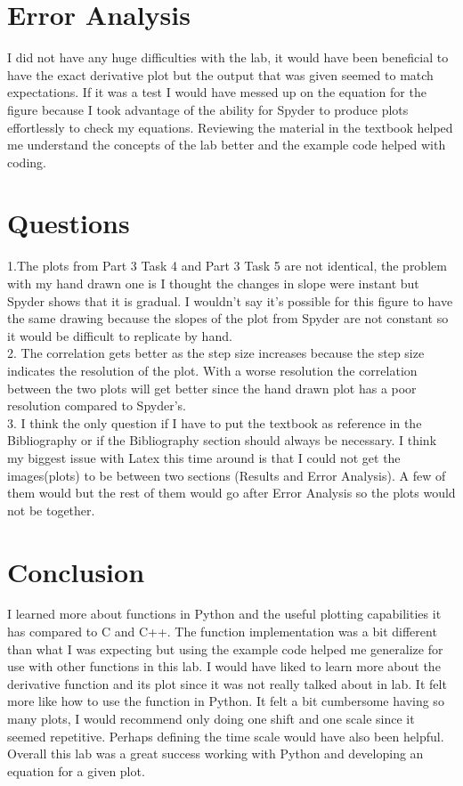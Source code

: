\documentclass[12pt]{report}
\begin{document}
\section{Error Analysis}
I did not have any huge difficulties with the lab, it would have been beneficial to have the exact derivative plot but the 
output that was given seemed to match expectations. If it was a test I would have messed up on the equation for the figure because
I took advantage of the ability for Spyder to produce plots effortlessly to check my equations. Reviewing the material in the textbook
helped me understand the concepts of the lab better and the example code helped with coding. 
\section{Questions}
1.The plots from Part 3 Task 4 and Part 3 Task 5 are not identical, the problem with my hand drawn one is 
I thought the changes in slope were instant but Spyder shows that it is gradual. I wouldn't say it's possible for this figure
to have the same drawing because the slopes of the plot from Spyder are not constant so it would be difficult to replicate by hand.\\
2. The correlation gets better as the step size increases because the step size indicates the resolution of the plot. With a worse resolution the correlation between the two plots will get better since the hand drawn plot has a poor resolution compared to Spyder's.\\
3. I think the only question if I have to put the textbook as reference in the Bibliography or if the Bibliography section should always
be necessary. I think my biggest issue with Latex this time around is that I could not get the images(plots) to be between two sections (Results and Error Analysis). A few of them would but the rest of them would go after Error Analysis so the plots would not be together.
\section{Conclusion}
I learned more about functions in Python and the useful plotting capabilities it has compared to C and C++. The function implementation 
was a bit different than what I was expecting but using the example code helped me generalize for use with other functions in this lab. I would have liked to learn more about the derivative function and its plot since it was not really talked about in lab. It felt more like how to use the function in Python. It felt a bit cumbersome having so many plots, I would recommend only doing one shift and one scale since it seemed repetitive. Perhaps defining the time scale would have also been helpful. Overall this lab was a great success working with Python and developing an equation for a given plot. 
\newpage
\end{document}
